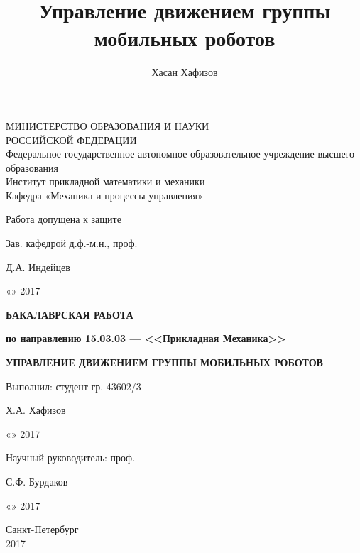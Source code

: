 \documentclass[a4paper, 14pt]{extarticle}
\author{Хасан Хафизов}
\title{Управление движением группы мобильных роботов}
\begin{document}
	\thispagestyle{empty}
\begin{center}%
	МИНИСТЕРСТВО ОБРАЗОВАНИЯ И НАУКИ \\
	РОССИЙСКОЙ ФЕДЕРАЦИИ \\
	
	Федеральное государственное автономное образовательное учреждение высшего образования \\
	
	Институт прикладной математики и механики \\
	Кафедра «Механика и процессы управления»
\end{center}%

{\raggedleft
	Работа допущена к защите\par
	Зав. кафедрой д.ф.-м.н., проф. \par
	\underline{\hspace{3.3cm}} Д.А. Индейцев \par
	«\underline{\hspace{1cm}}» \underline{\hspace{4cm}} 2017 \par
}
\begin{center}
	\textbf{БАКАЛАВРСКАЯ РАБОТА}
	
	\textbf{по направлению 15.03.03 — <<Прикладная Механика>>}
\end{center}
\begin{center}
	\textbf {\large УПРАВЛЕНИЕ ДВИЖЕНИЕМ ГРУППЫ МОБИЛЬНЫХ РОБОТОВ}
\end{center}%

{\raggedleft
	Выполнил: студент гр. 43602/3\par
	\underline{\hspace{3.5cm}} Х.А. Хафизов \par
	«\underline{\hspace{1cm}}» \underline{\hspace{4.0cm}} 2017 \par
	Научный руководитель: проф.\par
	\underline{\hspace{3.3cm}} С.Ф. Бурдаков\par
	«\underline{\hspace{1cm}}» \underline{\hspace{4.0cm}} 2017 \par
}
\vfill

\begin{center}%
	{Санкт-Петербург \\ 2017}
\end{center}%
\newpage
\setcounter{page}{1}
\tableofcontents
\newpage
\end{document}
